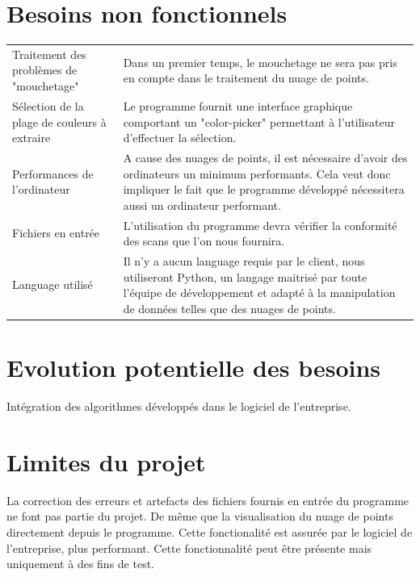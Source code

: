 \documentclass[12pt,titlepage,french]{article}
\begin{document}
\section{Besoins non fonctionnels}

\noindent\begin{tabu} to \textwidth {X[c]X[c3]}\toprule
     &\\\toprule
Traitement des problèmes de "mouchetage"
& Dans un premier temps, le mouchetage ne sera pas pris en compte dans le traitement du nuage de points.\\\midrule
Sélection de la plage de couleurs à extraire 
& Le programme fournit une interface graphique comportant un "color-picker" permettant à l'utilisateur d'effectuer la sélection.\\\midrule
Performances de l'ordinateur
& A cause des nuages de points, il est nécessaire d'avoir des ordinateurs un minimum performants. Cela veut donc impliquer le fait que le programme développé nécessitera aussi un ordinateur performant. \\\midrule
Fichiers en entrée
& L'utilisation du programme devra vérifier la conformité des scans que l'on nous fournira. \\\midrule
Language utilisé
& Il n'y a aucun language requis par le client, nous utiliseront Python, un langage maitrisé par toute l'équipe de développement et adapté à la manipulation de données telles que des nuages de points.\\\bottomrule

\end{tabu}

\section{Evolution potentielle des besoins}

Intégration des algorithmes développés dans le logiciel de l'entreprise.


\section{Limites du projet}

La correction des erreurs et artefacts des fichiers fournis en entrée du programme ne font pas partie du projet.
De même que la visualisation du nuage de points directement depuis le programme. Cette fonctionalité est assurée par le logiciel de l'entreprise, plus performant. Cette fonctionnalité peut être présente mais uniquement à des fins de test.
\end{document}
